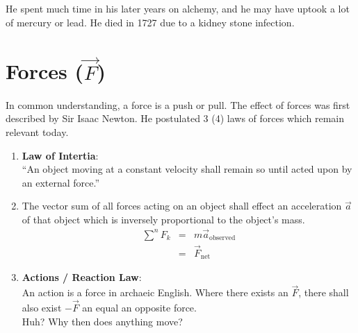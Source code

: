 \documentclass[letterpaper, 12pt]{article}
\begin{document}
He spent much time in his later years on alchemy, and he may have uptook a lot
of mercury or lead. He died in 1727 due to a kidney stone infection.

\section{Forces ($\vec{F}$)}
In common understanding, a force is a push or pull. The effect of forces was
first described by Sir Isaac Newton. He postulated 3 (4) laws of forces which
remain relevant today.
\begin{enumerate}
    \item \textbf{Law of Intertia}:\\
    ``An object moving at a constant velocity shall remain so until acted
    upon by an external force.''
    \item The vector sum of all forces acting on an object shall
    effect an acceleration $\vec{a}$ of that object which is inversely
    proportional to the object's mass.
    \[
        \begin{array}{lrl}
        \sum^n{F_k} & = & m\vec{a}_\textrm{observed}\\    
        & = & \vec{F}_\textrm{net}
        \end{array}
    \]
    \item \textbf{Actions / Reaction Law}:\\
    An action is a force in archaeic English. Where there exists an $\vec{F}$,
    there shall also exist $-\vec{F}$ an equal an opposite force.\\
    Huh? Why then does anything move?
\end{enumerate}
\end{document}
